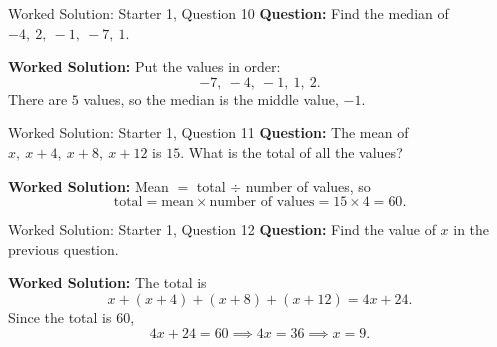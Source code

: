 \documentclass{beamer}
\begin{document}
\begin{frame}{Worked Solution: Starter 1, Question 10}
\small
\textbf{Question:} Find the median of \(-4,\ 2,\ -1,\ -7,\ 1\).

\smallskip
\textbf{Worked Solution:} Put the values in order:
\[
-7,\ -4,\ -1,\ 1,\ 2.
\]
There are \(5\) values, so the median is the middle value, \(-1\).
\end{frame}

\begin{frame}{Worked Solution: Starter 1, Question 11}
\small
\textbf{Question:} The mean of \(x,\ x+4,\ x+8,\ x+12\) is \(15\). What is the total of all the values?

\smallskip
\textbf{Worked Solution:} Mean \(=\) total \(\div\) number of values, so
\[
\text{total}=\text{mean}\times\text{number of values}=15\times4=60.
\]
\end{frame}

\begin{frame}{Worked Solution: Starter 1, Question 12}
\small
\textbf{Question:} Find the value of \(x\) in the previous question.

\smallskip
\textbf{Worked Solution:} The total is
\[
x+(x+4)+(x+8)+(x+12)=4x+24.
\]
Since the total is \(60\),
\[
4x+24=60 \implies 4x=36 \implies x=9.
\]
\end{frame}
\end{document}
